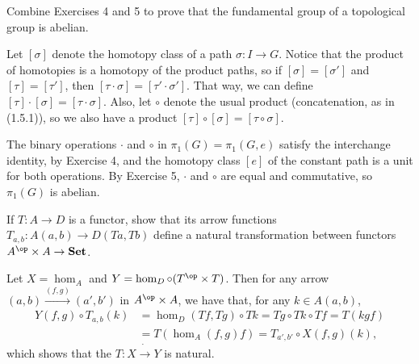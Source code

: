\begin{exercise}
Combine Exercises 4 and 5 to prove that the fundamental group of a topological group is abelian.
\end{exercise}
\begin{solution}
Let $[\sigma]$ denote the homotopy class of a path $\sigma:I\to G$. Notice that the product of homotopies is a homotopy of the product paths, so if $[\sigma]=[\sigma']$ and $[\tau]=[\tau']$, then $[\tau\cdot\sigma]=[\tau'\cdot\sigma']$. That way, we can define $[\tau]\cdot[\sigma]=[\tau\cdot\sigma]$. Also, let $\circ$ denote the usual product (concatenation, as in (1.5.1)), so we also have a product $[\tau]\circ[\sigma]=[\tau\circ\sigma]$.

The binary operations $\cdot$ and $\circ$ in $\pi_1(G)=\pi_1(G,e)$ satisfy the interchange identity, by Exercise 4, and the homotopy class $[e]$ of the constant path is a unit for both operations. By Exercise 5, $\cdot$ and $\circ$ are equal and commutative, so $\pi_1(G)$ is abelian.
\end{solution}

\begin{exercise}
If $T:A\to D$ is a functor, show that its arrow functions $T_{a,b}:A(a,b)\to D(Ta,Tb)$ define a natural transformation between functors $A^{\op}\times A\to \mathbf{Set}$.
\end{exercise}
\begin{solution}
Let $X=\hom_A$ and $Y=\hom_D \circ (T^{\op}\times T)$. Then for any arrow $(a,b)\overset{(f,g)}{\to}(a',b')$ in $A^{\op}\times A$, we have that, for any $k\in A(a,b)$,
\begin{align*}
Y(f,g)\circ T_{a,b}(k)&=\hom_D(Tf,Tg)\circ Tk=Tg\circ Tk\circ Tf=T(kgf)\\
&=T(\hom_A(f,g)f)=T_{a',b'}\circ X(f,g)(k),
\end{align*}
which shows that the $T:X\dot{\to}Y$ is natural.
\end{solution}

